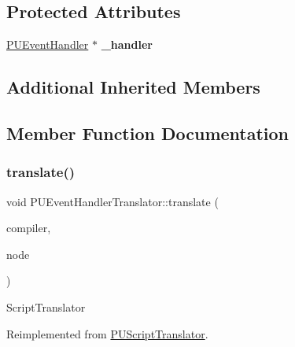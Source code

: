 \subsection*{Protected Attributes}
\begin{DoxyCompactItemize}
\item 
\mbox{\label{classPUEventHandlerTranslator_afa5ca9929d6df7ccf152dd7f4fa57b23}} 
\hyperlink{classPUEventHandler}{P\+U\+Event\+Handler} $\ast$ {\bfseries \+\_\+handler}
\end{DoxyCompactItemize}
\subsection*{Additional Inherited Members}


\subsection{Member Function Documentation}
\mbox{\label{classPUEventHandlerTranslator_acea6af37c14e6417ae0d3a67c35d7d46}} 
\subsubsection{\texorpdfstring{translate()}{translate()}\hspace{0.1cm}{\footnotesize\ttfamily [1/2]}}
{\footnotesize\ttfamily void P\+U\+Event\+Handler\+Translator\+::translate (\begin{DoxyParamCaption}\item[{\hyperlink{classPUScriptCompiler}{P\+U\+Script\+Compiler} $\ast$}]{compiler,  }\item[{\hyperlink{classPUAbstractNode}{P\+U\+Abstract\+Node} $\ast$}]{node }\end{DoxyParamCaption})\hspace{0.3cm}{\ttfamily [virtual]}}

Script\+Translator 

Reimplemented from \hyperlink{classPUScriptTranslator_a9ff2cdfda9ea8db6fd716e7b69dbe79b}{P\+U\+Script\+Translator}.

\mbox{\label{classPUEventHandlerTranslator_af36fbdee9013a8ad245279a382773c2e}} 

